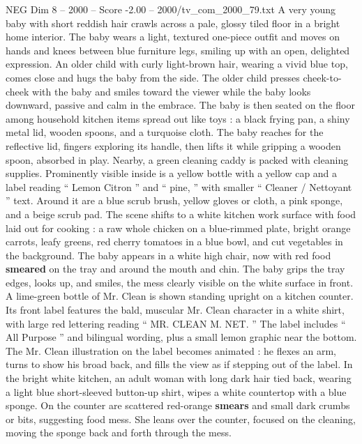 \begin{textsample}{NEG Dim 8 – 2000 – Score -2.00 – 2000/tv\_com\_2000\_79.txt}  \label{ex:f8_neg_089}
A very young baby with short reddish hair crawls across a pale, glossy tiled floor in a bright home interior.
The baby wears a light, textured one-piece outfit and moves on hands and knees between blue furniture legs, smiling up with an open, delighted expression.
An older child with curly light-brown hair, wearing a vivid blue top, comes close and hugs the baby from the side.
The older child presses cheek-to-cheek with the baby and smiles toward the viewer while the baby looks downward, passive and calm in the embrace.
The baby is then seated on the floor among household kitchen items spread out like toys : a black frying pan, a shiny metal lid, wooden spoons, and a turquoise cloth.
The baby reaches for the reflective lid, fingers exploring its handle, then lifts it while gripping a wooden spoon, absorbed in play.
Nearby, a green cleaning caddy is packed with cleaning supplies.
Prominently visible inside is a yellow bottle with a yellow cap and a label reading “ Lemon Citron ” and “ pine, ” with smaller “ Cleaner / Nettoyant ” text.
Around it are a blue scrub brush, yellow gloves or cloth, a pink sponge, and a beige scrub pad.
The scene shifts to a white kitchen work surface with food laid out for cooking : a raw whole chicken on a blue-rimmed plate, bright orange carrots, leafy greens, red cherry tomatoes in a blue bowl, and cut vegetables in the background.
The baby appears in a white high chair, now with red food \textbf{smeared} on the tray and around the mouth and chin.
The baby grips the tray edges, looks up, and smiles, the mess clearly visible on the white surface in front.
A lime-green bottle of Mr.
Clean is shown standing upright on a kitchen counter.
Its front label features the bald, muscular Mr.
Clean character in a white shirt, with large red lettering reading “ MR.
CLEAN M.
NET. ” The label includes “ All Purpose ” and bilingual wording, plus a small lemon graphic near the bottom.
The Mr.
Clean illustration on the label becomes animated : he flexes an arm, turns to show his broad back, and fills the view as if stepping out of the label.
In the bright white kitchen, an adult woman with long dark hair tied back, wearing a light blue short-sleeved button-up shirt, wipes a white countertop with a blue sponge.
On the counter are scattered red-orange \textbf{smears} and small dark crumbs or bits, suggesting food mess.
She leans over the counter, focused on the cleaning, moving the sponge back and forth through the mess.

\end{textsample}
